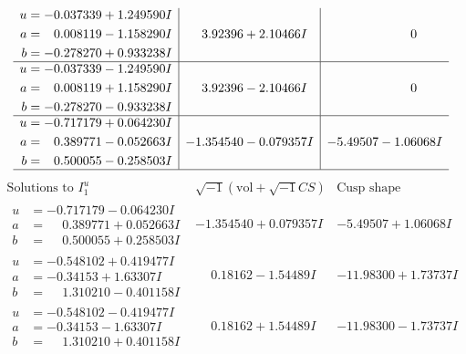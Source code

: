 \documentclass[1p]{elsarticle_modified}
\theoremstyle{definition}
\newcommand{\I}{\sqrt{-1}}
\begin{document}
$$\begin{array}{c|c|c}
\begin{aligned}
u &= -0.037339 + 1.249590 I \\
a &= \phantom{-}0.008119 - 1.158290 I \\
b &= -0.278270 + 0.933238 I\end{aligned}
 & \phantom{-}3.92396 + 2.10466 I & \phantom{-0.000000 } 0 \\ \hline\begin{aligned}
u &= -0.037339 - 1.249590 I \\
a &= \phantom{-}0.008119 + 1.158290 I \\
b &= -0.278270 - 0.933238 I\end{aligned}
 & \phantom{-}3.92396 - 2.10466 I & \phantom{-0.000000 } 0 \\ \hline\begin{aligned}
u &= -0.717179 + 0.064230 I \\
a &= \phantom{-}0.389771 - 0.052663 I \\
b &= \phantom{-}0.500055 - 0.258503 I\end{aligned}
 & -1.354540 - 0.079357 I & -5.49507 - 1.06068 I\\
 \hline 
 \end{array}$$\newpage$$\begin{array}{c|c|c}  
\text{Solutions to }I^u_{1}& \I (\text{vol} + \sqrt{-1}CS) & \text{Cusp shape}\\
 \hline 
\begin{aligned}
u &= -0.717179 - 0.064230 I \\
a &= \phantom{-}0.389771 + 0.052663 I \\
b &= \phantom{-}0.500055 + 0.258503 I\end{aligned}
 & -1.354540 + 0.079357 I & -5.49507 + 1.06068 I \\ \hline\begin{aligned}
u &= -0.548102 + 0.419477 I \\
a &= -0.34153 + 1.63307 I \\
b &= \phantom{-}1.310210 - 0.401158 I\end{aligned}
 & \phantom{-}0.18162 - 1.54489 I & -11.98300 + 1.73737 I \\ \hline\begin{aligned}
u &= -0.548102 - 0.419477 I \\
a &= -0.34153 - 1.63307 I \\
b &= \phantom{-}1.310210 + 0.401158 I\end{aligned}
 & \phantom{-}0.18162 + 1.54489 I & -11.98300 - 1.73737 I \\ \hline\begin{aligned}

\end{aligned}
\end{array}$$
\end{document}
